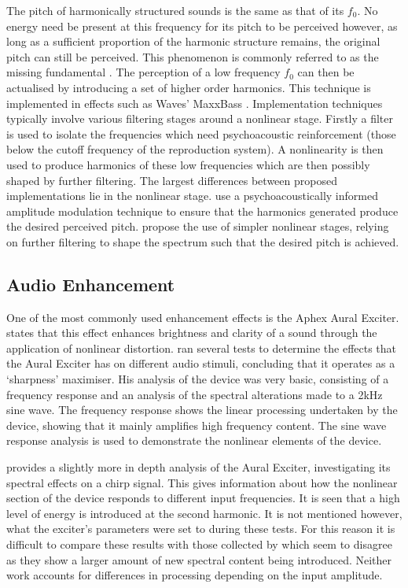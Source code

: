 		The pitch of harmonically structured sounds is the same as that of its $f_{0}$. No energy need be present
		at this frequency for its pitch to be perceived however, as long as a sufficient proportion of the harmonic
		structure remains, the original pitch can still be perceived. This phenomenon is commonly referred to as
		the missing fundamental \citep{plack2005the}. The perception of a low frequency $f_{0}$ can then be
		actualised by introducing a set of higher order harmonics. This technique is implemented in effects such as
		Waves' MaxxBass \citep{ben-tzur1999the}. Implementation techniques typically involve various filtering
		stages around a nonlinear stage. Firstly a filter is used to isolate the frequencies which need
		psychoacoustic reinforcement (those below the cutoff frequency of the reproduction system). A nonlinearity
		is then used to produce harmonics of these low frequencies which are then possibly shaped by further
		filtering. The largest differences between proposed implementations lie in the nonlinear stage.
		\citet{gan2001virtual} use a psychoacoustically informed amplitude modulation technique to ensure that the
		harmonics generated produce the desired perceived pitch. \citet{larsen2002reproducing} propose the use of
		simpler nonlinear stages, relying on further filtering to shape the spectrum such that the desired pitch is
		achieved.

	\subsection{Audio Enhancement}
	\label{sec:Excitation-Uses-Enhancement}
		One of the most commonly used enhancement effects is the Aphex Aural Exciter. \citet{shekar2013modeling}
		states that this effect enhances brightness and clarity of a sound through the application of nonlinear
		distortion. \citet{chalupper2000aural} ran several tests to determine the effects that the Aural Exciter
		has on different audio stimuli, concluding that it operates as a `sharpness' maximiser. His analysis of the
		device was very basic, consisting of a frequency response and an analysis of the spectral alterations made
		to a 2kHz sine wave. The frequency response shows the linear processing undertaken by the device, showing
		that it mainly amplifies high frequency content. The sine wave response analysis is used to demonstrate the
		nonlinear elements of the device. 

		\citet{dutilleux2011nonlinear} provides a slightly more in depth analysis of the Aural Exciter,
		investigating its spectral effects on a chirp signal. This gives information about how the nonlinear
		section of the device responds to different input frequencies. It is seen that a high level of energy is
		introduced at the second harmonic. It is not mentioned however, what the exciter's parameters were set to
		during these tests.  For this reason it is difficult to compare these results with those collected by
		\citet{chalupper2000aural} which seem to disagree as they show a larger amount of new spectral content
		being introduced. Neither work accounts for differences in processing depending on the input amplitude.

